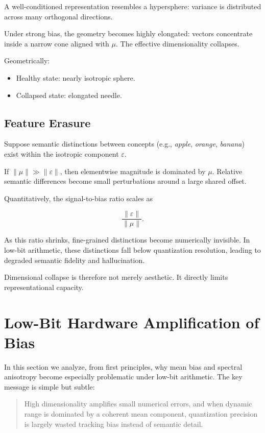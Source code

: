 A well-conditioned representation resembles a hypersphere:
variance is distributed across many orthogonal directions.

Under strong bias, the geometry becomes highly elongated:
vectors concentrate inside a narrow cone aligned with $\mu$.
The effective dimensionality collapses.

Geometrically:
\begin{itemize}
\item Healthy state: nearly isotropic sphere.
\item Collapsed state: elongated needle.
\end{itemize}

\subsection{Feature Erasure}

Suppose semantic distinctions between concepts
(e.g., \textit{apple}, \textit{orange}, \textit{banana})
exist within the isotropic component $\varepsilon$.

If $\|\mu\| \gg \|\varepsilon\|$,
then elementwise magnitude is dominated by $\mu$.
Relative semantic differences become small perturbations
around a large shared offset.

Quantitatively,
the signal-to-bias ratio scales as

\[
\frac{\|\varepsilon\|}{\|\mu\|}.
\]

As this ratio shrinks,
fine-grained distinctions become numerically invisible.
In low-bit arithmetic, these distinctions fall below quantization
resolution, leading to degraded semantic fidelity and hallucination.

Dimensional collapse is therefore not merely aesthetic.
It directly limits representational capacity.

\section{Low-Bit Hardware Amplification of Bias}
\label{sec:lowbit_amplification}

In this section we analyze, from first principles, why mean bias and spectral anisotropy become especially problematic under low-bit arithmetic.
The key message is simple but subtle:

\begin{quote}
High dimensionality amplifies small numerical errors, and when dynamic range is dominated by a coherent mean component, quantization precision is largely wasted tracking bias instead of semantic detail.
\end{quote}

